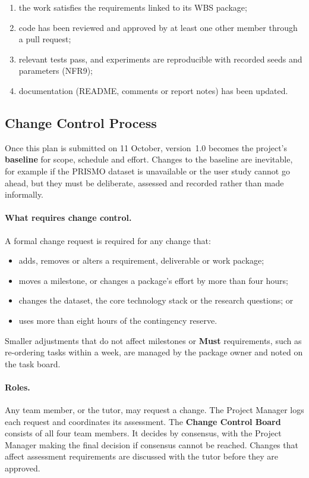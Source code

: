 \begin{enumerate}[nosep]
  \item the work satisfies the requirements linked to its WBS package;
  \item code has been reviewed and approved by at least one other member through a pull request;
  \item relevant tests pass, and experiments are reproducible with recorded seeds and parameters (NFR9);
  \item documentation (README, comments or report notes) has been updated.
\end{enumerate}

\subsection{Change Control Process}\label{sec:change-control}

Once this plan is submitted on 11 October, version~1.0 becomes the project's \textbf{baseline} for scope, schedule and effort. Changes to the baseline are inevitable, for example if the PRISMO dataset is unavailable or the user study cannot go ahead, but they must be deliberate, assessed and recorded rather than made informally.

\paragraph{What requires change control.} A formal change request is required for any change that:

\begin{itemize}[nosep]
  \item adds, removes or alters a requirement, deliverable or work package;
  \item moves a milestone, or changes a package's effort by more than four hours;
  \item changes the dataset, the core technology stack or the research questions; or
  \item uses more than eight hours of the contingency reserve.
\end{itemize}

Smaller adjustments that do not affect milestones or \textbf{Must} requirements, such as re-ordering tasks within a week, are managed by the package owner and noted on the task board.

\paragraph{Roles.} Any team member, or the tutor, may request a change. The Project Manager logs each request and coordinates its assessment. The \textbf{Change Control Board} consists of all four team members. It decides by consensus, with the Project Manager making the final decision if consensus cannot be reached. Changes that affect assessment requirements are discussed with the tutor before they are approved.

